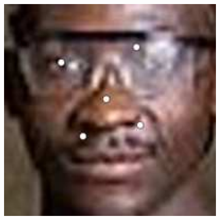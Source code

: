 \documentclass[journal]{IEEEtran}
\begin{document}
\begin{figure}[!htb]
{\begin{minipage}[b]{0.38\textwidth}
\includegraphics[scale=0.22]{5_ALR_755}


\end{minipage}}
\end{figure}
\end{document}
